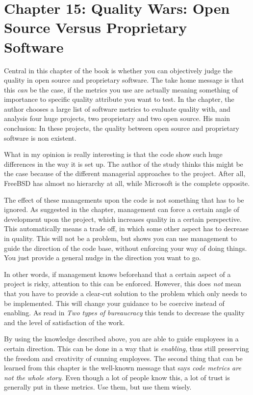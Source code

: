 \documentclass[]{uva-bachelor-thesis}
\begin{document}
\chapter{Chapter 15: Quality Wars: Open Source Versus Proprietary Software \cite{makingsoftware}}
Central in this chapter of the book is whether you can objectively judge the quality in open source and proprietary software.
The take home message is that this \emph{can} be the case, if the metrics you use are actually meaning something of importance to specific quality attribute you want to test. 
In the chapter, the author chooses a large list of software metrics to evaluate quality with, and analysis four huge projects, two proprietary and two open source. 
His main conclusion: In these projects, the quality between open source and proprietary software is non existent.

What in my opinion is really interesting is that the code show such huge differences in the way it is set up. 
The author of the study thinks this might be the case because of the different managerial approaches to the project. 
After all, FreeBSD has almost no hierarchy at all, while Microsoft is the complete opposite.

The effect of these managements upon the code is not something that has to be ignored.
As suggested in the chapter, management can force a certain angle of development upon the project, which increases quality in a certain perspective. 
This automatically means a trade off, in which some other aspect has to decrease in quality.
This will not be a problem, but shows you can use management to guide the direction of the code base, without enforcing your way of doing things.
You just provide a general nudge in the direction you want to go.

In other words, if management knows beforehand that a certain aspect of a project is risky, attention to this can be enforced. 
However, this does \emph{not} mean that you have to provide a clear-cut solution to the problem which only needs to be implemented. 
This will change your guidance to be coercive instead of enabling.
As read in \emph{Two types of bureaucracy}\cite{adler1996two} this tends to decrease the quality and the level of satisfaction of the work.

By using the knowledge described above, you are able to guide employees in a certain direction.
This can be done in a way that is \emph{enabling}, thus still preserving the freedom and creativity of cunning employees. 
The second thing that can be learned from this chapter is the well-known message that says \emph{code metrics are not the whole story}. 
Even though a lot of people know this, a lot of trust is generally put in these metrics. 
Use them, but use them wisely.
\end{document}

